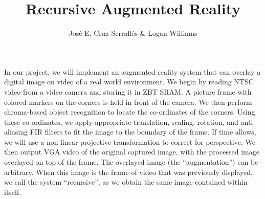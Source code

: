 \documentclass[11pt]{article}
\title{Recursive Augmented Reality}
\author{Jos\'{e} E. Cruz Serrall\'{e}s \& Logan Williams}
\date{}
\begin{document}
\maketitle


In our project, we will implement an augmented reality system that can overlay a digital image on video of a real world environment. We begin by reading NTSC video from a video camera and storing it in ZBT SRAM. A picture frame with colored markers on the corners is held in front of the camera. We then perform chroma-based object recognition to locate the co-ordinates of the corners. Using these co-ordinates, we apply appropriate translation, scaling, rotation, and anti-aliasing FIR filters to fit the image to the boundary of the frame. If time allows, we will use a non-linear projective transformation to correct for perspective. We then output VGA video of the original captured image, with the processed image overlayed on top of the frame. The overlayed image (the ``augmentation'') can be arbitrary. When this image is the frame of video that was previously displayed, we call the system ``recursive'', as we obtain the same image contained within itself.
\end{document}

